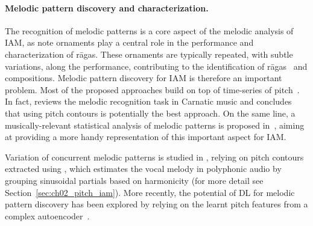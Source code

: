 \paragraph*{Melodic pattern discovery and characterization.}
The recognition of melodic patterns is a core aspect of the melodic analysis of \acrshort{IAM}, as note ornaments play a central role in the performance and characterization of rāgas. These ornaments are typically repeated, with subtle variations, along the performance, contributing to the identification of rāgas~\citep{kassebaum-karnatak} and compositions.
Melodic pattern discovery for \acrshort{IAM} is therefore an important problem. Most of the proposed approaches build on top of time-series of pitch~\citep{ishwar-motif_alapana,rao-motifs,gulati-mining,gulati-motifs_communities,nuttall-matrix}. In fact, \citep{velankar-pattern_pitch} reviews the melodic recognition task in Carnatic music and concludes that using pitch contours is potentially the best approach. On the same line, a musically-relevant statistical analysis of melodic patterns is proposed in~\citep{viraraghavan-statistical}, aiming at providing a more handy representation of this important aspect for \acrshort{IAM}.

Variation of concurrent melodic patterns is studied in \citep{ganguli-motifs}, relying on pitch contours extracted using \citep{rao-pitch}, which estimates the vocal melody in polyphonic audio by grouping sinusoidal partials based on harmonicity (for more detail see Section~\ref{sec:ch02_pitch_iam}).
%
More recently, the potential of \acrshort{DL} for melodic pattern discovery has been explored by relying on the learnt pitch features from a complex autoencoder~\citep{nuttall-sancaras}.





